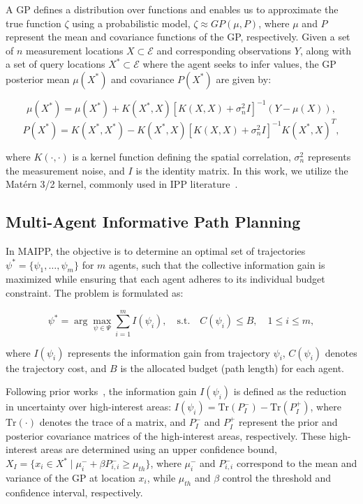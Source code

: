 \documentclass[runningheads]{llncs}
\begin{document}
A GP defines a distribution over functions and enables us to approximate the true function $\zeta$ using a probabilistic model, $\zeta \approx GP(\mu, P)$, where $\mu$ and $P$ represent the mean and covariance functions of the GP, respectively. Given a set of $n$ measurement locations $X \subset \mathcal{E}$ and corresponding observations $Y$, along with a set of query locations $X^* \subset \mathcal{E}$ where the agent seeks to infer values, the GP posterior mean $\mu(X^*)$ and covariance $P(X^*)$ are given by:  

\begin{equation}
\mu(X^*) = \mu(X^*) + K(X^*, X)[K(X, X) + \sigma_n^2 I]^{-1} (Y - \mu(X)),
\end{equation}  
\begin{equation}
P(X^*) = K(X^*, X^*) - K(X^*, X)[K(X, X) + \sigma_n^2 I]^{-1} K(X^*, X)^T,
\end{equation}

where $K(\cdot, \cdot)$ is a kernel function defining the spatial correlation, $\sigma_n^2$ represents the measurement noise, and $I$ is the identity matrix. In this work, we utilize the Matérn 3/2 kernel, commonly used in IPP literature~\cite{cao2023catnipp,hitz_adaptive_2017,popovic_informative_2020,yang2023intentmaipp}.  

\subsection{Multi-Agent Informative Path Planning}
\label{sec: maipp_problem}
In MAIPP, the objective is to determine an optimal set of trajectories $\psi^* = \{\psi_1, \dots, \psi_m\}$ for $m$ agents, such that the collective information gain is maximized while ensuring that each agent adheres to its individual budget constraint. The problem is formulated as:  

\begin{equation}
\psi^* = \arg\max_{\psi \in \Psi} \sum_{i=1}^m I(\psi_i), \quad \text{s.t.} \quad C(\psi_i) \leq B, \quad 1 \leq i \leq m,
\end{equation}

where $I(\psi_i)$ represents the information gain from trajectory $\psi_i$, $C(\psi_i)$ denotes the trajectory cost, and $B$ is the allocated budget (path length) for each agent.  

Following prior works~\cite{cao2023catnipp,yang2023intentmaipp}, the information gain $I(\psi_i)$ is defined as the reduction in uncertainty over high-interest areas: $I(\psi_i) = \text{Tr}(P^-_I) - \text{Tr}(P^+_I)$, where $\text{Tr}(\cdot)$ denotes the trace of a matrix, and $P^-_I$ and $P^+_I$ represent the prior and posterior covariance matrices of the high-interest areas, respectively. These high-interest areas are determined using an upper confidence bound, $X_I = \{x_i \in X^* \mid \mu_i^- + \beta P^-_{i,i} \geq \mu_{th} \}$, where $\mu_i^-$ and $P^-_{i,i}$ correspond to the mean and variance of the GP at location $x_i$, while $\mu_{th}$ and $\beta$ control the threshold and confidence interval, respectively.
\end{document}
